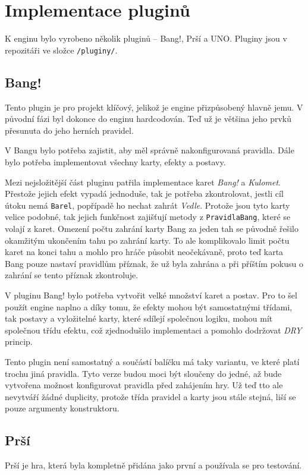 \section{Implementace pluginů}
K enginu bylo vyrobeno několik pluginů -- Bang!, Prší a UNO. Pluginy jsou v repozitáři ve složce \texttt{/pluginy/}.

\subsection{Bang!}
Tento plugin je pro projekt klíčový, jelikož je engine přizpůsobený hlavně jemu. V původní fázi byl dokonce do enginu hardcodován. Teď už je většina jeho prvků přesunuta do jeho herních pravidel.

V Bangu bylo potřeba zajistit, aby měl správně nakonfigurovaná pravidla. Dále bylo potřeba implementovat všechny karty, efekty a postavy.

Mezi nejsložitější část pluginu patřila implementace karet \emph{Bang!} a \emph{Kulomet}. Přestože jejich efekt vypadá jednoduše, tak je potřeba zkontrolovat, jestli cíl útoku nemá \texttt{Barel}, popřípadě ho nechat zahrát \emph{Vedle}. Protože jsou tyto karty velice podobné, tak jejich funkčnost zajišťují metody z \texttt{PravidlaBang}, které se volají z karet. Omezení počtu zahrání karty Bang za jeden tah se původně řešilo okamžitým ukončením tahu po zahrání karty. To ale komplikovalo limit počtu karet na konci tahu a mohlo pro hráče působit neočekávaně, proto teď karta Bang pouze nastaví pravidlům příznak, že už byla zahrána a při příštím pokusu o zahrání se tento příznak zkontroluje.

V pluginu Bang! bylo potřeba vytvořit velké množství karet a postav. Pro to šel použít engine naplno a díky tomu, že efekty mohou být samostatnými třídami, tak postavy a vyložitelné karty, které sdílejí společnou logiku, mohou mít společnou třídu efektu, což zjednodušilo implementaci a pomohlo dodržovat \emph{DRY} princip.

Tento plugin není samostatný a součástí balíčku má taky variantu, ve které platí trochu jiná pravidla. Tyto verze budou moci být sloučeny do jedné, až bude vytvořena možnost konfigurovat pravidla před zahájením hry. Už teď tto ale nevytváří žádné duplicity, protože třída pravidel a karty jsou stále stejná, liší se pouze argumenty konstruktoru.

\subsection{Prší}
Prší je hra, která byla kompletně přidána jako první a používala se pro testování.

